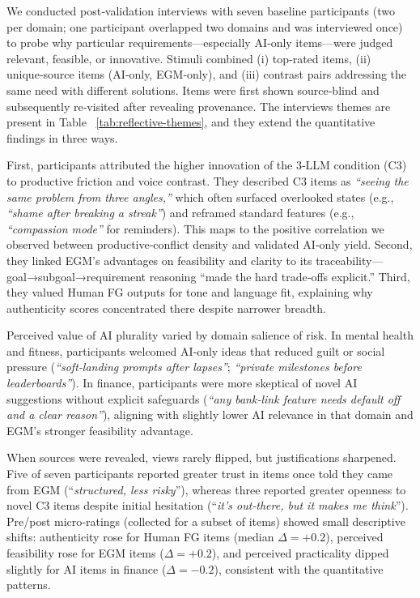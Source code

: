\documentclass[acmsmall]{acmart}
\begin{document}
We conducted post‑validation interviews with seven baseline participants (two per domain; one participant overlapped two domains and was interviewed once) to probe why particular requirements—especially AI‑only items—were judged relevant, feasible, or innovative. Stimuli combined (i) top‑rated items, (ii) unique‑source items (AI‑only, EGM‑only), and (iii) contrast pairs addressing the same need with different solutions. Items were first shown source‑blind and subsequently re‑visited after revealing provenance. The interviews themes are present in Table ~\ref{tab:reflective-themes}, and they extend the quantitative findings in three ways.

First, participants attributed the higher innovation of the 3‑LLM condition (C3) to productive friction and voice contrast. They described C3 items as \emph{“seeing the same problem from three angles,”} which often surfaced overlooked states (e.g., \emph{“shame after breaking a streak”}) and reframed standard features (e.g., \emph{“compassion mode”} for reminders). This maps to the positive correlation we observed between productive‑conflict density and validated AI‑only yield. Second, they linked EGM’s advantages on feasibility and clarity to its traceability—goal→subgoal→requirement reasoning “made the hard trade‑offs explicit.” Third, they valued Human FG outputs for tone and language fit, explaining why authenticity scores concentrated there despite narrower breadth.

Perceived value of AI plurality varied by domain salience of risk. In mental health and fitness, participants welcomed AI‑only ideas that reduced guilt or social pressure (\emph{“soft‑landing prompts after lapses”}; \emph{“private milestones before leaderboards”}). In finance, participants were more skeptical of novel AI suggestions without explicit safeguards (\emph{“any bank‑link feature needs default off and a clear reason”}), aligning with slightly lower AI relevance in that domain and EGM’s stronger feasibility advantage.

When sources were revealed, views rarely flipped, but justifications sharpened. Five of seven participants reported greater trust in items once told they came from EGM (“\emph{structured, less risky}”), whereas three reported greater openness to novel C3 items despite initial hesitation (“\emph{it’s out‑there, but it makes me think}”). Pre/post micro‑ratings (collected for a subset of items) showed small descriptive shifts: authenticity rose for Human FG items (median $\Delta{=}+0.2$), perceived feasibility rose for EGM items ($\Delta{=}+0.2$), and perceived practicality dipped slightly for AI items in finance ($\Delta{=}-0.2$), consistent with the quantitative patterns.
\end{document}
